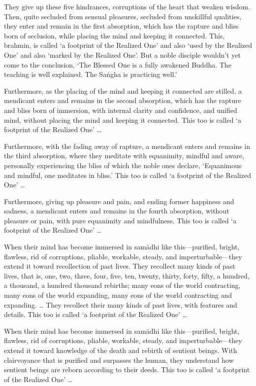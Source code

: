 \documentclass[12pt,openany]{book}%
\begin{document}
They give up these five hindrances, corruptions of the heart that weaken wisdom. Then, quite secluded from sensual pleasures, secluded from unskillful qualities, they enter and remain in the first absorption, which has the rapture and bliss born of seclusion, while placing the mind and keeping it connected. This, brahmin, is called ‘a footprint of the Realized One’ and also ‘used by the Realized One’ and also ‘marked by the Realized One’. But a noble disciple wouldn’t yet come to the conclusion, ‘The Blessed One is a fully awakened Buddha. The teaching is well explained. The \textsanskrit{Saṅgha} is practicing well.’ 

Furthermore, as the placing of the mind and keeping it connected are stilled, a mendicant enters and remains in the second absorption, which has the rapture and bliss born of immersion, with internal clarity and confidence, and unified mind, without placing the mind and keeping it connected. This too is called ‘a footprint of the Realized One’ … 

Furthermore, with the fading away of rapture, a mendicant enters and remains in the third absorption, where they meditate with equanimity, mindful and aware, personally experiencing the bliss of which the noble ones declare, ‘Equanimous and mindful, one meditates in bliss.’ This too is called ‘a footprint of the Realized One’ … 

Furthermore, giving up pleasure and pain, and ending former happiness and sadness, a mendicant enters and remains in the fourth absorption, without pleasure or pain, with pure equanimity and mindfulness. This too is called ‘a footprint of the Realized One’ … 

When their mind has become immersed in \textsanskrit{samādhi} like this—purified, bright, flawless, rid of corruptions, pliable, workable, steady, and imperturbable—they extend it toward recollection of past lives. They recollect many kinds of past lives, that is, one, two, three, four, five, ten, twenty, thirty, forty, fifty, a hundred, a thousand, a hundred thousand rebirths; many eons of the world contracting, many eons of the world expanding, many eons of the world contracting and expanding. … They recollect their many kinds of past lives, with features and details. This too is called ‘a footprint of the Realized One’ … 

When their mind has become immersed in \textsanskrit{samādhi} like this—purified, bright, flawless, rid of corruptions, pliable, workable, steady, and imperturbable—they extend it toward knowledge of the death and rebirth of sentient beings. With clairvoyance that is purified and surpasses the human, they understand how sentient beings are reborn according to their deeds. This too is called ‘a footprint of the Realized One’ … 
\end{document}
